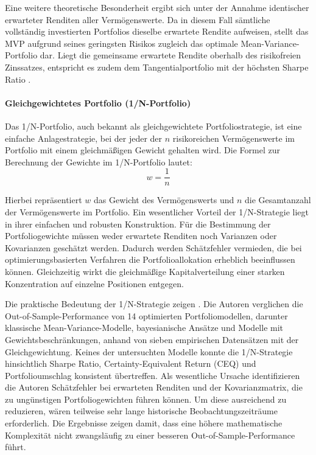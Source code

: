 \documentclass[a4paper, 12pt]{article}
\begin{document}
Eine weitere theoretische Besonderheit ergibt sich unter der Annahme identischer erwarteter Renditen aller Vermögenswerte.
Da in diesem Fall sämtliche vollständig investierten Portfolios dieselbe erwartete Rendite aufweisen, stellt das MVP aufgrund seines geringsten Risikos zugleich das optimale Mean-Variance-Portfolio dar.
Liegt die gemeinsame erwartete Rendite oberhalb des risikofreien Zinssatzes, entspricht es zudem dem Tangentialportfolio mit der höchsten Sharpe Ratio \parencite{lee2011,chaves2011}.

\paragraph{Gleichgewichtetes Portfolio (1/N-Portfolio)}
Das 1/N-Portfolio, auch bekannt als gleichgewichtete Portfoliostrategie, ist eine einfache Anlagestrategie, bei der jeder der $n$ risikoreichen Vermögenswerte im Portfolio mit einem gleichmäßigen Gewicht gehalten wird.
Die Formel zur Berechnung der Gewichte im 1/N-Portfolio lautet:
\begin{equation}
	w = \frac{1}{n}
	\label{eq:naiv}
\end{equation}

Hierbei repräsentiert $w$ das Gewicht des Vermögenswerts und $n$ die Gesamtanzahl der Vermögenswerte im Portfolio.
Ein wesentlicher Vorteil der 1/N-Strategie liegt in ihrer einfachen und robusten Konstruktion.
Für die Bestimmung der Portfoliogewichte müssen weder erwartete Renditen noch Varianzen oder Kovarianzen geschätzt werden.
Dadurch werden Schätzfehler vermieden, die bei optimierungsbasierten Verfahren die Portfolioallokation erheblich beeinflussen können.
Gleichzeitig wirkt die gleichmäßige Kapitalverteilung einer starken Konzentration auf einzelne Positionen entgegen.

Die praktische Bedeutung der 1/N-Strategie zeigen \textcite{demiguel2009}.
Die Autoren verglichen die Out-of-Sample-Performance von 14 optimierten Portfoliomodellen, darunter klassische Mean-Variance-Modelle, bayesianische Ansätze und Modelle mit Gewichtsbeschränkungen, anhand von sieben empirischen Datensätzen mit der Gleichgewichtung.
Keines der untersuchten Modelle konnte die 1/N-Strategie hinsichtlich Sharpe Ratio, Certainty-Equivalent Return (CEQ) und Portfolioumschlag konsistent übertreffen.
Als wesentliche Ursache identifizieren die Autoren Schätzfehler bei erwarteten Renditen und der Kovarianzmatrix, die zu ungünstigen Portfoliogewichten führen können.
Um diese ausreichend zu reduzieren, wären teilweise sehr lange historische Beobachtungszeiträume erforderlich.
Die Ergebnisse zeigen damit, dass eine höhere mathematische Komplexität nicht zwangsläufig zu einer besseren Out-of-Sample-Performance führt.
\end{document}
